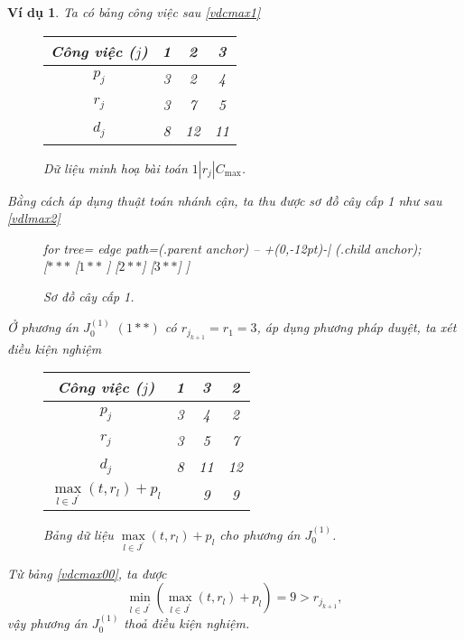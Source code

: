 \documentclass[12pt,a4paper]{report}
\newtheorem{vd}{Ví dụ}
\begin{document}
\begin{vd} \label{vdrjcmax1}
Ta có bảng công việc sau \eqref{vdcmax1}

\begin{figure}[h!]
	\centering
	\begin{tabular}{|c | c c c |} 
	\hline
	Công việc ($j$) & 1 & 2 & 3 \\
	\hline\hline
	$p_j$ & 3 & 2 & 4 \\
	$r_j$ & 3 & 7 & 5 \\
	$d_j$ & 8 & 12 & 11 \\
	\hline
	\end{tabular}
\caption{\label{vdcmax1} Dữ liệu minh hoạ bài toán $1 | r_j | C_{\max}$.}
\end{figure}



Bằng cách áp dụng thuật toán nhánh cận, ta thu được sơ đồ cây cấp 1 như sau \eqref{vdlmax2}


\begin{figure}[h!]
	\centering
	\begin{forest} for tree={
		edge path={\noexpand{} (.parent anchor) -- +(0,-12pt)-| (.child anchor);}
	}
	[{$***$}
		[$1**$
		]
		[$2**$]
		[$3**$]
	]
	\end{forest}
\caption{\label{vdlmax2} Sơ đồ cây cấp 1.}
\end{figure}

Ở phương án $J_0^{(1)}$ $(1**)$ có $r_{j_{k+1}} = r_1 = 3$, áp dụng phương pháp duyệt, ta xét điều kiện nghiệm

\begin{figure}[h!]
	\centering
	\begin{tabular}{|c | c c c |} 
	\hline
	Công việc ($j$) & 1 & 3 & 2 \\
	\hline\hline
	$p_j$ & 3 & 4 & 2 \\
	$r_j$ & 3 & 5 & 7 \\
	$d_j$ & 8 & 11 & 12 \\
	$\underset{l \in J^{'}}{\max} (t, r_l) + p_l$ & & 9 & 9 \\ 
	\hline
	\end{tabular}
\caption{\label{vdcmax00} Bảng dữ liệu $\underset{l \in J^{'}}{\max} (t, r_l) + p_l$ cho phương án $J_0^{(1)}$.}
\end{figure}

Từ bảng \eqref{vdcmax00}, ta được
\begin{equation*}
\underset{l \in J^{'}}{\min} (\underset{l \in J^{'}}{\max} (t, r_l) + p_l) = 9 > r_{j_{k+1}},
\end{equation*}
vậy phương án $J_0^{(1)}$ thoả điều kiện nghiệm.


\end{vd}
\end{document}
